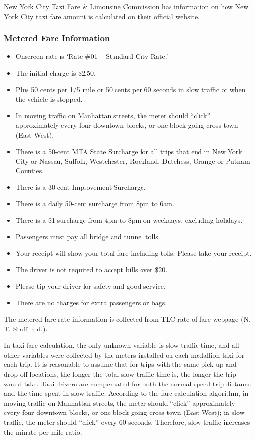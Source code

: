 \documentclass[12pt,twoside]{reedthesis}
\providecommand{\tightlist}{%
  \setlength{\itemsep}{0pt}\setlength{\parskip}{0pt}}
\theoremstyle{definition}
\theoremstyle{definition}
\theoremstyle{definition}
\theoremstyle{remark}
\begin{document}
New York City Taxi Fare \& Limousine Commission has information on how
New York City taxi fare amount is calculated on their
\href{http://www.nyc.gov/html/tlc/html/passenger/taxicab_rate.shtml}{official
website}.

\subsubsection{Metered Fare Information}\label{metered-fare-information}
\begin{itemize}
\tightlist
\item
  Onscreen rate is `Rate \#01 -- Standard City Rate.'
\item
  The initial charge is \$2.50.
\item
  Plus 50 cents per 1/5 mile or 50 cents per 60 seconds in slow traffic
  or when the vehicle is stopped.
\item
  In moving traffic on Manhattan streets, the meter should ``click''
  approximately every four downtown blocks, or one block going
  cross-town (East-West).
\item
  There is a 50-cent MTA State Surcharge for all trips that end in New
  York City or Nassau, Suffolk, Westchester, Rockland, Dutchess, Orange
  or Putnam Counties.
\item
  There is a 30-cent Improvement Surcharge.
\item
  There is a daily 50-cent surcharge from 8pm to 6am.
\item
  There is a \$1 surcharge from 4pm to 8pm on weekdays, excluding
  holidays.
\item
  Passengers must pay all bridge and tunnel tolls.
\item
  Your receipt will show your total fare including tolls. Please take
  your receipt.
\item
  The driver is not required to accept bills over \$20.
\item
  Please tip your driver for safety and good service.
\item
  There are no charges for extra passengers or bags.
\end{itemize}
The metered fare rate information is collected from TLC rate of fare
webpage (N. T. Staff, n.d.).

In taxi fare calculation, the only unknown variable is slow-traffic
time, and all other variables were collected by the meters installed on
each medallion taxi for each trip. It is reasonable to assume that for
trips with the same pick-up and drop-off locations, the longer the total
slow traffic time is, the longer the trip would take. Taxi drivers are
compensated for both the normal-speed trip distance and the time spent
in slow-traffic. According to the fare calculation algorithm, in moving
traffic on Manhattan streets, the meter should ``click'' approximately
every four downtown blocks, or one block going cross-town (East-West);
in slow traffic, the meter should ``click'' every 60 seconds. Therefore,
slow traffic increases the minute per mile ratio.
\end{document}
